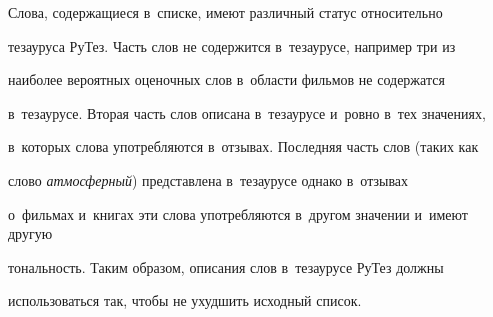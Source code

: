 Слова, содержащиеся в~списке, имеют различный статус относительно


тезауруса РуТез. Часть слов не содержится в~тезаурусе, например три из


наиболее вероятных оценочных слов в~области фильмов не содержатся


в~тезаурусе. Вторая часть слов описана в~тезаурусе и~ровно в~тех значениях,


в~которых слова употребляются в~отзывах. Последняя часть слов (таких как


слово \textit{атмосферный}) представлена в~тезаурусе однако в~отзывах


о~фильмах и~книгах эти слова употребляются в~другом значении и~имеют другую


тональность. Таким образом, описания слов в~тезаурусе РуТез должны


использоваться так, чтобы не ухудшить исходный список.





